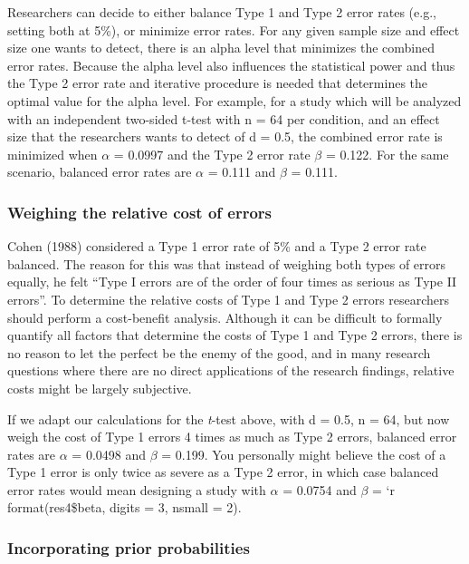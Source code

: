 \documentclass[,jou,floatsintext]{apa6}
\begin{document}
Researchers can decide to either balance Type 1 and Type 2 error rates (e.g., setting both at 5\%), or minimize error rates. For any given sample size and effect size one wants to detect, there is an alpha level that minimizes the combined error rates. Because the alpha level also influences the statistical power and thus the Type 2 error rate and iterative procedure is needed that determines the optimal value for the alpha level. For example, for a study which will be analyzed with an independent two-sided t-test with n = 64 per condition, and an effect size that the researchers wants to detect of d = 0.5, the combined error rate is minimized when \(\alpha\) = 0.0997 and the Type 2 error rate \(\beta\) = 0.122. For the same scenario, balanced error rates are \(\alpha\) = 0.111 and \(\beta\) = 0.111.

\hypertarget{weighing-the-relative-cost-of-errors}{%
\subsubsection{Weighing the relative cost of errors}\label{weighing-the-relative-cost-of-errors}}

Cohen (1988) considered a Type 1 error rate of 5\% and a Type 2 error rate balanced. The reason for this was that instead of weighing both types of errors equally, he felt \enquote{Type I errors are of the order of four times as serious as Type II errors}. To determine the relative costs of Type 1 and Type 2 errors researchers should perform a cost-benefit analysis. Although it can be difficult to formally quantify all factors that determine the costs of Type 1 and Type 2 errors, there is no reason to let the perfect be the enemy of the good, and in many research questions where there are no direct applications of the research findings, relative costs might be largely subjective.

If we adapt our calculations for the \emph{t}-test above, with d = 0.5, n = 64, but now weigh the cost of Type 1 errors 4 times as much as Type 2 errors, balanced error rates are \(\alpha\) = 0.0498 and \(\beta\) = 0.199. You personally might believe the cost of a Type 1 error is only twice as severe as a Type 2 error, in which case balanced error rates would mean designing a study with \(\alpha\) = 0.0754 and \(\beta\) = `r format(res4\$beta, digits = 3, nsmall = 2).

\hypertarget{incorporating-prior-probabilities}{%
\subsubsection{Incorporating prior probabilities}\label{incorporating-prior-probabilities}}
\end{document}
